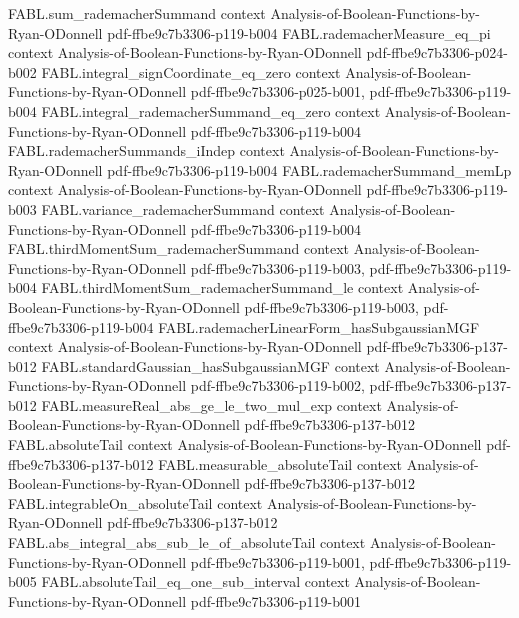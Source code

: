 \begin{theorem}
\proofstep
  {FABL.sum_rademacherSummand}
  {context}
  {Analysis-of-Boolean-Functions-by-Ryan-ODonnell}
  {pdf-ffbe9c7b3306-p119-b004}
\proofstep
  {FABL.rademacherMeasure_eq_pi}
  {context}
  {Analysis-of-Boolean-Functions-by-Ryan-ODonnell}
  {pdf-ffbe9c7b3306-p024-b002}
\proofstep
  {FABL.integral_signCoordinate_eq_zero}
  {context}
  {Analysis-of-Boolean-Functions-by-Ryan-ODonnell}
  {pdf-ffbe9c7b3306-p025-b001,
    pdf-ffbe9c7b3306-p119-b004}
\proofstep
  {FABL.integral_rademacherSummand_eq_zero}
  {context}
  {Analysis-of-Boolean-Functions-by-Ryan-ODonnell}
  {pdf-ffbe9c7b3306-p119-b004}
\proofstep
  {FABL.rademacherSummands_iIndep}
  {context}
  {Analysis-of-Boolean-Functions-by-Ryan-ODonnell}
  {pdf-ffbe9c7b3306-p119-b004}
\proofstep
  {FABL.rademacherSummand_memLp}
  {context}
  {Analysis-of-Boolean-Functions-by-Ryan-ODonnell}
  {pdf-ffbe9c7b3306-p119-b003}
\proofstep
  {FABL.variance_rademacherSummand}
  {context}
  {Analysis-of-Boolean-Functions-by-Ryan-ODonnell}
  {pdf-ffbe9c7b3306-p119-b004}
\proofstep
  {FABL.thirdMomentSum_rademacherSummand}
  {context}
  {Analysis-of-Boolean-Functions-by-Ryan-ODonnell}
  {pdf-ffbe9c7b3306-p119-b003,
    pdf-ffbe9c7b3306-p119-b004}
\proofstep
  {FABL.thirdMomentSum_rademacherSummand_le}
  {context}
  {Analysis-of-Boolean-Functions-by-Ryan-ODonnell}
  {pdf-ffbe9c7b3306-p119-b003,
    pdf-ffbe9c7b3306-p119-b004}
\proofstep
  {FABL.rademacherLinearForm_hasSubgaussianMGF}
  {context}
  {Analysis-of-Boolean-Functions-by-Ryan-ODonnell}
  {pdf-ffbe9c7b3306-p137-b012}
\proofstep
  {FABL.standardGaussian_hasSubgaussianMGF}
  {context}
  {Analysis-of-Boolean-Functions-by-Ryan-ODonnell}
  {pdf-ffbe9c7b3306-p119-b002,
    pdf-ffbe9c7b3306-p137-b012}
\proofstep
  {FABL.measureReal_abs_ge_le_two_mul_exp}
  {context}
  {Analysis-of-Boolean-Functions-by-Ryan-ODonnell}
  {pdf-ffbe9c7b3306-p137-b012}
\proofstep
  {FABL.absoluteTail}
  {context}
  {Analysis-of-Boolean-Functions-by-Ryan-ODonnell}
  {pdf-ffbe9c7b3306-p137-b012}
\proofstep
  {FABL.measurable_absoluteTail}
  {context}
  {Analysis-of-Boolean-Functions-by-Ryan-ODonnell}
  {pdf-ffbe9c7b3306-p137-b012}
\proofstep
  {FABL.integrableOn_absoluteTail}
  {context}
  {Analysis-of-Boolean-Functions-by-Ryan-ODonnell}
  {pdf-ffbe9c7b3306-p137-b012}
\proofstep
  {FABL.abs_integral_abs_sub_le_of_absoluteTail}
  {context}
  {Analysis-of-Boolean-Functions-by-Ryan-ODonnell}
  {pdf-ffbe9c7b3306-p119-b001,
    pdf-ffbe9c7b3306-p119-b005}
\proofstep
  {FABL.absoluteTail_eq_one_sub_interval}
  {context}
  {Analysis-of-Boolean-Functions-by-Ryan-ODonnell}
  {pdf-ffbe9c7b3306-p119-b001}

\end{theorem}
